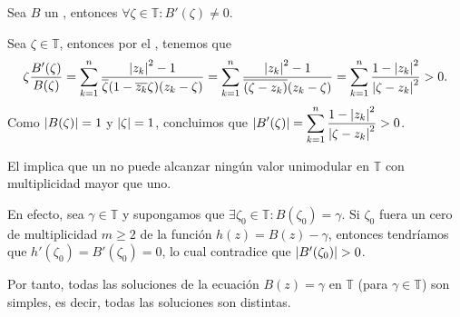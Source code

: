 \begin{lem}\label{lem:derivada-prod-finito-blaschke-no-nula-toro}
    Sea $B$ un , entonces $\forall \zeta \in \mathbb{T} : B'(\zeta) \neq 0$.
\end{lem}
\begin{dem}
    Sea $\zeta \in \mathbb{T}$, entonces por el , tenemos que
    \[
    \zeta \frac{B'(\zeta)}{B(\zeta)} = \sum_{k=1}^n \frac{\left|z_k\right|^2 - 1}{\overline{\zeta} (1 - \overline{z_k} \zeta)(z_k - \zeta)} = \sum_{k=1}^n \frac{\left|z_k\right|^2 - 1}{\overline{\left(\zeta - z_k\right)} (z_k - \zeta)} = \sum_{k=1}^n \frac{1 - \left|z_k\right|^2}{\left|\zeta - z_k\right|^2} > 0.
    \]
    Como $\left|B(\zeta)\right| = 1$ y $\left|\zeta\right| = 1$, concluimos que $\displaystyle \left|B'(\zeta)\right| = \sum_{k=1}^n \frac{1 - \left|z_k\right|^2}{\left|\zeta - z_k\right|^2} > 0$.\hfill\qedsymbol
\end{dem}

\begin{obs}
    El  implica que un  no puede alcanzar ningún valor unimodular en $\mathbb{T}$ con multiplicidad mayor que uno. 
    
    En efecto, sea $\gamma \in \mathbb{T}$ y supongamos que $\exists \zeta_0 \in \mathbb{T} : B(\zeta_0) = \gamma$. Si $\zeta_0$ fuera un cero de multiplicidad $m \geq 2$ de la función $h(z) = B(z) - \gamma$, entonces tendríamos que $h'(\zeta_0) = B'(\zeta_0) = 0$, lo cual contradice que $\left|B'(\zeta_0)\right| > 0$.
    
    Por tanto, todas las soluciones de la ecuación $B(z) = \gamma$ en $\mathbb{T}$ (para $\gamma \in \mathbb{T}$) son simples, es decir, todas las soluciones son distintas.
\end{obs}

